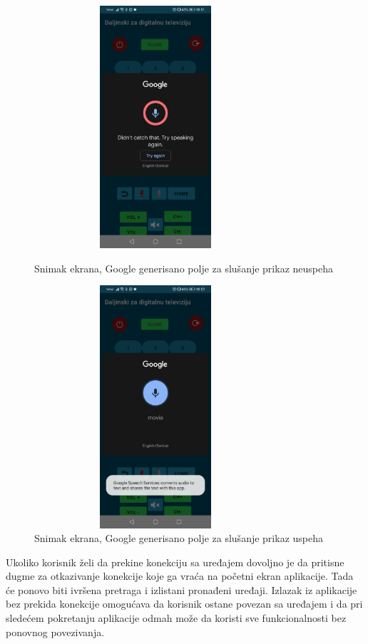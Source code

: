 \documentclass[implementacija.tex]{subfiles}
\begin{document}
\begin{figure}[h!]
\centering
\begin{minipage}{.5\textwidth}
  \centering
  \includegraphics[width=9cm,height=9cm,keepaspectratio]{Implementacija/snimci_ekrana/11_obican_google_neuspesno.jpg}
  \caption{Snimak ekrana, Google generisano polje za slušanje prikaz neuspeha}
  \label{fig:google_neuspesno}
\end{minipage}%
\begin{minipage}{.5\textwidth}
  \centering
  \includegraphics[width=9cm,height=9cm,keepaspectratio]{Implementacija/snimci_ekrana/11_obican_google_uspesno.jpg}
  \caption{Snimak ekrana, Google generisano polje za slušanje prikaz uspeha}
   \label{fig:google_uspesno}
\end{minipage}
\end{figure}

Ukoliko korisnik želi da prekine konekciju sa uređajem dovoljno je da pritisne dugme za otkazivanje konekcije koje ga vraća na početni ekran aplikacije. Tada će ponovo biti ivršena pretraga i izlistani pronađeni uređaji. Izlazak iz aplikacije bez prekida konekcije omogućava da korisnik ostane povezan sa uređajem i da pri sledećem pokretanju aplikacije odmah može da koristi sve funkcionalnosti bez ponovnog povezivanja.
\end{document}
